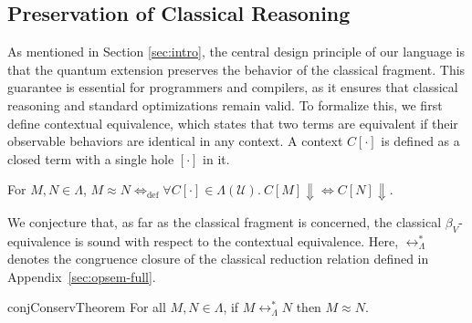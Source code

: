 \subsection{Preservation of Classical Reasoning}
As mentioned in Section \ref{sec:intro}, the central design principle of our language is that the quantum extension preserves the behavior of the classical fragment.
This guarantee is essential for programmers and compilers, as it ensures that classical reasoning and standard optimizations remain valid.
To formalize this, we first define contextual equivalence, which states that two terms are equivalent if their observable behaviors are identical in any context.
A context $C[\cdot]$ is defined as a closed term with a single hole $[\cdot]$ in it.
\begin{dfn} \label{def:contextual-equiv}
  For $M, N \in \Lambda$, $M\approx N \Leftrightarrow_\mathrm{def} \forall C[\cdot]\in\Lambda(\mathcal{U}).\ C[M] \Downarrow \Leftrightarrow C[N] \Downarrow$.
\end{dfn}

We conjecture that, as far as the classical fragment is concerned, the classical $\beta_V$-equivalence is sound with respect to the contextual equivalence.
Here, $\longleftrightarrow^*_\Lambda$ denotes the congruence closure of the classical reduction relation defined in Appendix~\ref{sec:opsem-full}.
\begin{restatable}{conj}{ConservTheorem} \label{conj:conservativity}
  For all $M, N \in \Lambda$, if $M \longleftrightarrow^*_\Lambda N$ then $M \approx N$.
\end{restatable}
